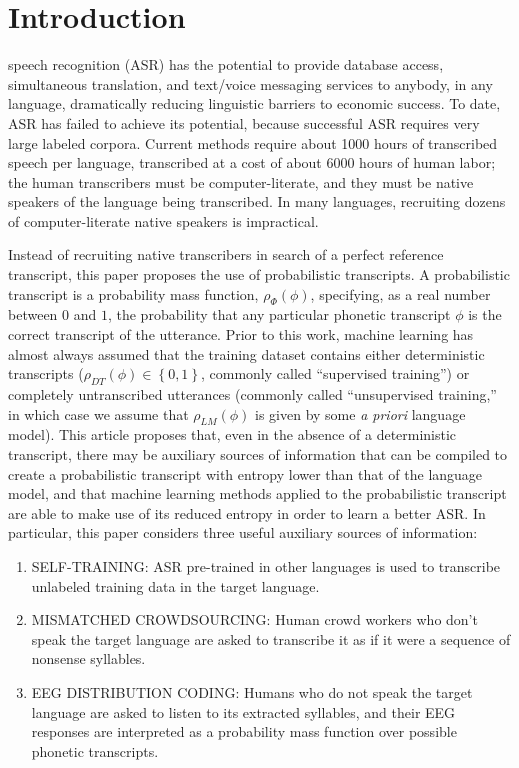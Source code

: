 \section{Introduction}

 speech recognition (ASR) has the potential to provide
database access, simultaneous translation, and text/voice messaging
services to anybody, in any language, dramatically reducing linguistic
barriers to economic success.  To date, ASR has failed to achieve its
potential, because successful ASR requires very large labeled
corpora. Current methods require about 1000 hours of transcribed
speech per language, transcribed at a cost of about 6000 hours of
human labor; the human transcribers must be computer-literate, and
they must be native speakers of the language being transcribed.  In
many languages, recruiting dozens of computer-literate
native speakers is impractical.

Instead of recruiting native transcribers in search of a perfect
reference transcript, this paper proposes the use of probabilistic
transcripts.  A probabilistic transcript is a probability mass
function, $\rho_\Phi(\phi)$, specifying, as a real number between $0$ and
$1$, the probability that any particular phonetic transcript $\phi$
is the correct transcript of the utterance.  Prior to this work,
machine learning has almost always assumed that the training dataset
contains either deterministic transcripts
($\rho_{DT}(\phi)\in\left\{0,1\right\}$, commonly called ``supervised
training'') or completely untranscribed utterances (commonly called
``unsupervised training,'' in which case we assume that $\rho_{LM}(\phi)$
is given by some {\em a priori} language model).  This article
proposes that, even in the absence of a deterministic transcript,
there may be auxiliary sources of information that can be compiled to
create a probabilistic transcript with entropy lower than that
of the language model, and that machine learning methods applied to
the probabilistic transcript are able to make use of its reduced
entropy in order to learn a better ASR.  In particular,
this paper considers three useful auxiliary sources of information:
\begin{enumerate}
\item SELF-TRAINING: ASR pre-trained in other languages is used to
  transcribe unlabeled training data in the target language.
\item MISMATCHED CROWDSOURCING: Human crowd workers who don't speak
  the target language are asked to transcribe it as if it were a
  sequence of nonsense syllables.
\item EEG DISTRIBUTION CODING: Humans who do not speak the target
  language are asked to listen to its extracted syllables, and their
  EEG responses are interpreted as a probability mass function over
  possible phonetic transcripts.
\end{enumerate}

